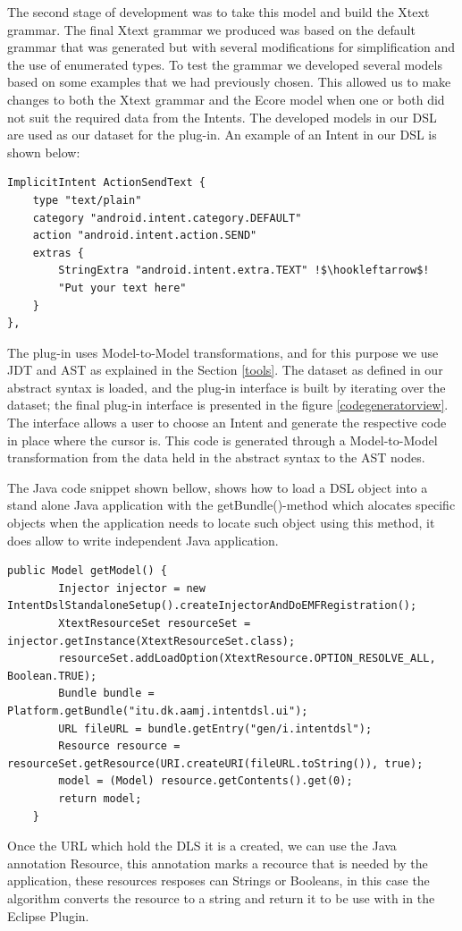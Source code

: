 The second stage of development was to take this model and build the Xtext grammar. The final Xtext grammar we produced was based on the default grammar that was generated but with several modifications for simplification and the use of enumerated types. To test the grammar we developed several models based on some examples that we had previously chosen. This allowed us to make changes to both the Xtext grammar and the Ecore model when one or both did not suit the required data from the Intents. The developed models in our DSL are used as our dataset for the plug-in. An example of an Intent in our DSL is shown below:

{\footnotesize\begin{lstlisting}[escapechar=!]
ImplicitIntent ActionSendText {
	type "text/plain"
	category "android.intent.category.DEFAULT"
	action "android.intent.action.SEND"
	extras {
		StringExtra "android.intent.extra.TEXT" !$\hookleftarrow$!
		"Put your text here"
	}
},
\end{lstlisting}}

The plug-in uses Model-to-Model transformations, and for this purpose we use JDT and AST as explained in the Section \ref{tools}. The dataset as defined in our abstract syntax is loaded, and the plug-in interface is built by iterating over the dataset; the final plug-in interface is presented in the figure \ref{codegeneratorview}. The interface allows a user to choose an Intent and generate the respective code in place where the cursor is. This code is generated through a Model-to-Model transformation from the data held in the abstract syntax to the AST nodes.

The Java code snippet shown bellow, shows how to load a DSL object into a stand alone Java application with the getBundle()-method which alocates specific objects when the application needs to locate such object using this method, it does allow to write independent Java application.
{\footnotesize\begin{lstlisting}[escapechar=!]
public Model getModel() {
		Injector injector = new IntentDslStandaloneSetup().createInjectorAndDoEMFRegistration();
		XtextResourceSet resourceSet = injector.getInstance(XtextResourceSet.class);
		resourceSet.addLoadOption(XtextResource.OPTION_RESOLVE_ALL, Boolean.TRUE);
		Bundle bundle = Platform.getBundle("itu.dk.aamj.intentdsl.ui");
		URL fileURL = bundle.getEntry("gen/i.intentdsl");
		Resource resource = resourceSet.getResource(URI.createURI(fileURL.toString()), true);
		model = (Model) resource.getContents().get(0);
		return model;
	}
\end{lstlisting}}
Once the URL which hold the DLS it is a created, we can use the Java annotation Resource, this annotation marks a recource that is needed by the application, these resources resposes can Strings or Booleans, in this case the algorithm converts the resource to a string and return it to be use with in the Eclipse Plugin. 

